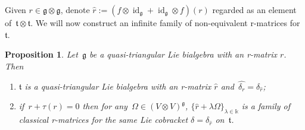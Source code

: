 \documentclass[12pt, reqno]{amsart}
\newcommand{\wh}[1]{\widehat{#1}}
\newtheorem{proposition}[theorem]{Proposition}
\theoremstyle{definition}
\numberwithin{equation}{section}
\newcommand{\tensor}{\otimes}
\newcommand{\kk}{\mathbb{k}}\newcommand{\lie}[1]{{\mathfrak{#1}}}
\newenvironment{enumalph}{\begin{enumerate}[label={\rm(\alph*)},leftmargin=*]}{\end{enumerate}}
\DeclareMathOperator{\id}{id}
\begin{document}
Given $r\in \lie g\tensor \lie g$, denote 
$\wh r:=(f\tensor\id_{\lie g}+\id_{\lie g}\tensor f)(r)$
regarded as an element of~$\lie t\tensor\lie t$.
We will now construct an infinite family of non-equivalent r-matrices for~$\lie t$.
\begin{proposition}\label{prop:takiff}
Let~$\lie g$ be a quasi-triangular Lie bialgebra with an r-matrix $r$.
Then 
\begin{enumalph}
    \item\label{prop:takiff.a}
    $\lie t$ is a quasi-triangular Lie bialgebra with an r-matrix $\wh{r}$ and~$\wh{\delta_r}=\delta_{\wh r}$;
    \item\label{prop:takiff.b} if~$r+\tau(r)=0$ then for any~$\Omega\in (V\tensor V)^{\lie g}$,
    $\{\wh{r}+\lambda \Omega\}_{\lambda\in\kk}$ is 
    a family of classical r-matrices for the same Lie cobracket 
    $\delta=\delta_{\wh{r}}$ on~$\lie t$.
\end{enumalph}
\end{proposition}
\end{document}
